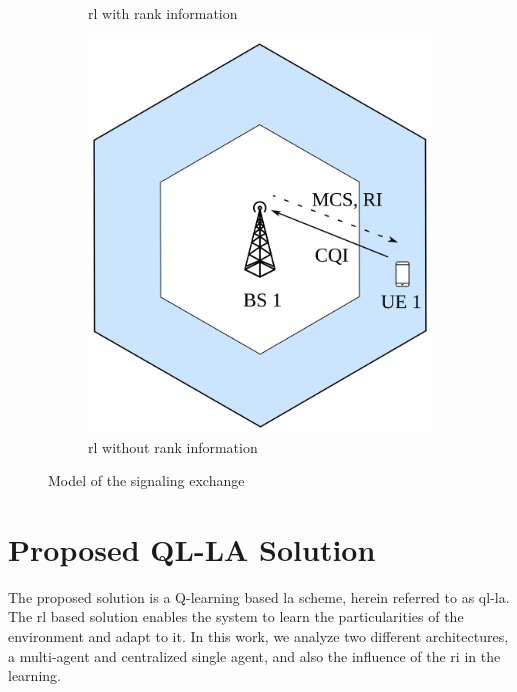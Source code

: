 \begin{figure}
\begin{subfigure}[htb]{0.3\textwidth}
         \caption{\gls{rl} with rank information}
         \label{fig:la-system-model-2}
     \end{subfigure}
     \hfill
     \begin{subfigure}[htb]{0.3\textwidth}
         \centering
         \includegraphics[width=\textwidth]{figures/chp_la/system_model_3.png}
         \caption{\gls{rl} without rank information}
         \label{fig:la-system-model-3}
     \end{subfigure}
        \caption{Model of the signaling exchange}
        \label{fig:la-system-model}
\end{figure}




\section{Proposed QL-LA Solution}
\label{sec:la-proposed}

The proposed solution is a Q-learning based \gls{la} scheme, herein referred to as \gls{ql-la}.
%
The \gls{rl} based solution enables the system to learn the particularities of the environment and adapt to it.
%
In this work, we analyze two different architectures, a multi-agent and centralized single agent, and also the influence of the \gls{ri} in the learning.


